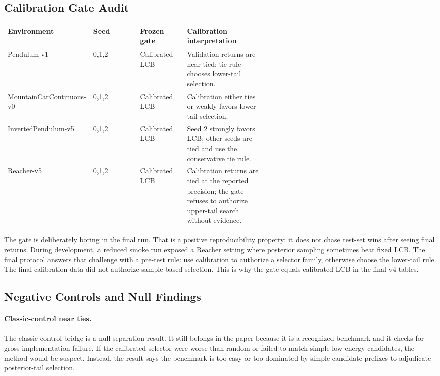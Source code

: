 \documentclass{article}
\begin{document}
\subsection{Calibration Gate Audit}

\begin{center}
\small
\begin{tabularx}{\linewidth}{p{0.24\linewidth}p{0.18\linewidth}p{0.18\linewidth}X}
\toprule
Environment & Seed & Frozen gate & Calibration interpretation \\
\midrule
Pendulum-v1 & 0,1,2 & Calibrated LCB &
Validation returns are near-tied; tie rule chooses lower-tail selection. \\
MountainCarContinuous-v0 & 0,1,2 & Calibrated LCB &
Calibration either ties or weakly favors lower-tail selection. \\
InvertedPendulum-v5 & 0,1,2 & Calibrated LCB &
Seed 2 strongly favors LCB; other seeds are tied and use the conservative
tie rule. \\
Reacher-v5 & 0,1,2 & Calibrated LCB &
Calibration returns are tied at the reported precision; the gate refuses to
authorize upper-tail search without evidence. \\
\bottomrule
\end{tabularx}
\end{center}

The gate is deliberately boring in the final run. That is a positive
reproducibility property: it does not chase test-set wins after seeing final
returns. During development, a reduced smoke run exposed a Reacher setting
where posterior sampling sometimes beat fixed LCB. The final protocol answers
that challenge with a pre-test rule: use calibration to authorize a selector
family, otherwise choose the lower-tail rule. The final calibration data did
not authorize sample-based selection. This is why the gate equals calibrated
LCB in the final v4 tables.

\subsection{Negative Controls and Null Findings}

\paragraph{Classic-control near ties.}
The classic-control bridge is a null separation result. It still belongs in
the paper because it is a recognized benchmark and it checks for gross
implementation failure. If the calibrated selector were worse than random or
failed to match simple low-energy candidates, the method would be suspect.
Instead, the result says the benchmark is too easy or too dominated by simple
candidate prefixes to adjudicate posterior-tail selection.
\end{document}
